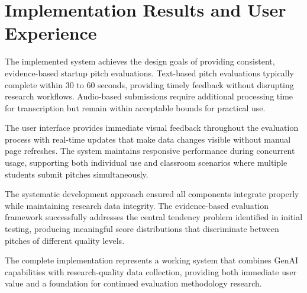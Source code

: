 \section{Implementation Results and User Experience}\label{sec:results}

The implemented system achieves the design goals of providing consistent, evidence-based startup pitch evaluations. Text-based pitch evaluations typically complete within 30 to 60 seconds, providing timely feedback without disrupting research workflows. Audio-based submissions require additional processing time for transcription but remain within acceptable bounds for practical use.

The user interface provides immediate visual feedback throughout the evaluation process with real-time updates that make data changes visible without manual page refreshes. The system maintains responsive performance during concurrent usage, supporting both individual use and classroom scenarios where multiple students submit pitches simultaneously.

The systematic development approach ensured all components integrate properly while maintaining research data integrity. The evidence-based evaluation framework successfully addresses the central tendency problem identified in initial testing, producing meaningful score distributions that discriminate between pitches of different quality levels.

The complete implementation represents a working system that combines GenAI capabilities with research-quality data collection, providing both immediate user value and a foundation for continued evaluation methodology research.